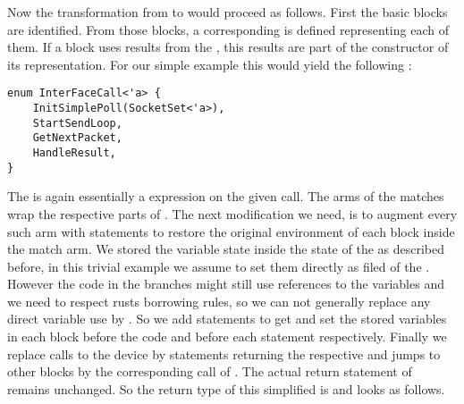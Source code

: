 Now the transformation from  to  would proceed as follows. First the basic blocks are identified. From those blocks, a corresponding  is defined representing each of them. If a block uses results from the \dev{}, this results are part of the constructor of its  representation. For our simple example this would yield the following :

\begin{verbatim}
enum InterFaceCall<'a> {
    InitSimplePoll(SocketSet<'a>),
    StartSendLoop,
    GetNextPacket,
    HandleResult,
}
\end{verbatim}

The  is again essentially a  expression on the given call. The arms of the matches wrap the respective parts of . The next modification we need, is to augment every such arm with statements to restore the original environment of each block inside the match arm. We stored the variable state inside the state of the \stack{} as described before, in this trivial example we assume to set them directly as filed of the \stack{}. However the code in the branches might still use references to the variables and we need to respect rusts borrowing rules, so we can not generally replace any direct variable use  by . So we add statements to get and set the stored variables in each block before the code and before each  statement respectively. Finally we replace calls to the device by statements returning the respective  and jumps to other blocks by the corresponding call of . The actual return statement of  remains unchanged. So the return type of this simplified  is  and looks as follows. 

